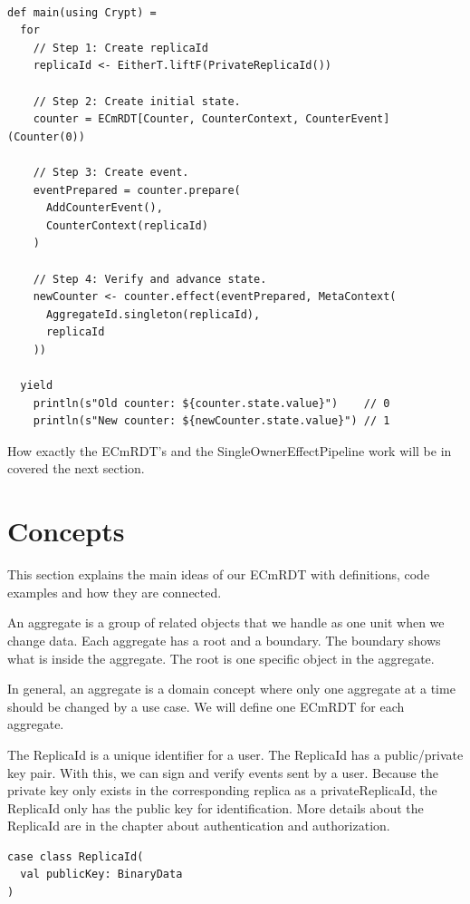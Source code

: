 \documentclass[
	ngerman,
	ruledheaders=section,   %
	class=report,		    %
	thesis={type=bachelor}, %
	accentcolor=9c,			%
	custommargins=true,    %
	marginpar=false,        %
	parskip=half-,          %
	fontsize=11pt,          %
]{tudapub}
\begin{document}
\begin{lstlisting}
    
def main(using Crypt) = 
  for
    // Step 1: Create replicaId
    replicaId <- EitherT.liftF(PrivateReplicaId())

    // Step 2: Create initial state.
    counter = ECmRDT[Counter, CounterContext, CounterEvent](Counter(0))

    // Step 3: Create event.
    eventPrepared = counter.prepare(
      AddCounterEvent(),
      CounterContext(replicaId)
    )

    // Step 4: Verify and advance state.
    newCounter <- counter.effect(eventPrepared, MetaContext(
      AggregateId.singleton(replicaId), 
      replicaId
    ))

  yield
    println(s"Old counter: ${counter.state.value}")    // 0
    println(s"New counter: ${newCounter.state.value}") // 1

\end{lstlisting}

How exactly the ECmRDT's and the SingleOwnerEffectPipeline work will be in covered the next section.

\section{Concepts}

This section explains the main ideas of our ECmRDT with definitions, code examples and how they are connected.


An aggregate is a group of related objects that we handle as one unit when we change data. Each aggregate has a root and a boundary. The boundary shows what is inside the aggregate. The root is one specific object in the aggregate. 

In general, an aggregate is a domain concept where only one aggregate at a time should be changed by a use case. We will define one ECmRDT for each aggregate.

The ReplicaId is a unique identifier for a user. The ReplicaId has a public/private key pair. With this, we can sign and verify events sent by a user. Because the private key only exists in the corresponding replica as a privateReplicaId, the ReplicaId only has the public key for identification. More details about the ReplicaId are in the chapter about authentication and authorization.

\begin{lstlisting}
case class ReplicaId(
  val publicKey: BinaryData
)
\end{lstlisting}
\end{document}
